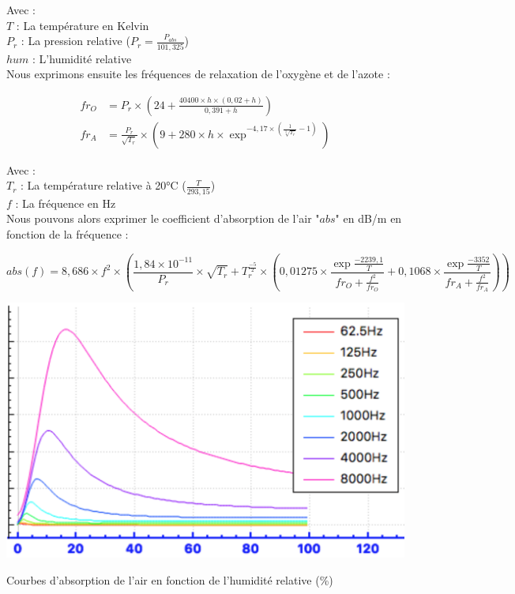 Avec : \\
$T$ : La température en Kelvin \\
$P_r$ : La pression relative ($P_r = \frac{P_{abs}}{101,325}$) \\
$hum$ : L'humidité relative \\

Nous exprimons ensuite les fréquences de relaxation de l'oxygène et de l'azote \cite[6.2, eq. 3 et 4]{iso}:

\begin{align}
	fr_O & =  P_r \times (24 + \frac{40400 \times h \times (0,02 + h)}{0,391 + h})  \\
	fr_A & =  \frac{P_r}{\sqrt{T_r}} \times (9 + 280 \times h \times \exp^{-4,17 \times (\frac{1}{\sqrt[3]{T_r}} - 1)})
\end{align}


Avec : \\
$T_r$ : La température relative à 20°C ($\frac{T}{293,15}$) \\
$f$ : La fréquence en Hz \\

Nous pouvons alors exprimer le coefficient d'absorption de l'air "$abs$" en dB/m en fonction de la fréquence  \cite[6.2, eq. 5]{iso} :

\begin{equation}
	abs(f) = 8,686 \times f^2 \times (\frac{1,84 \times 10^{-11}}{P_r} \times \sqrt{T_r} + T_r^{\frac{-5}{2}} \times (0,01275 \times \frac{\exp{\frac{-2239,1}{T}}}{fr_O + \frac{f^2}{fr_O}} + 0,1068 \times  \frac{\exp{\frac{-3352}{T}}}{fr_A + \frac{f^2}{fr_A}}))
\end{equation}

\begin{figureth}
	\includegraphics[width=0.8\linewidth]{images/courbesAbs}
	\caption{Courbes d'absorption de l'air en fonction de l'humidité relative (\%)}
	\label{courbesAbs}
\end{figureth}


